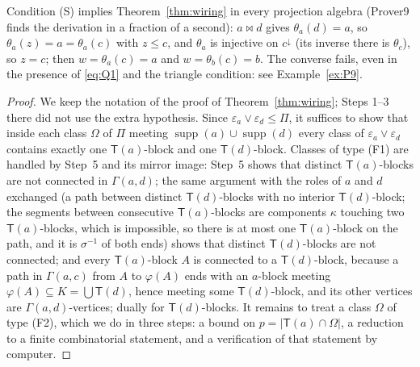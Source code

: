\documentclass[11pt]{amsart}
\theoremstyle{definition}
\newcommand{\supp}{\operatorname{supp}}
\newcommand{\T}{\mathsf{T}}
\begin{document}
Condition (S) implies Theorem~\ref{thm:wiring} in every projection algebra (Prover9 finds the derivation in a fraction of a second): $a\bowtie d$ gives $\theta_a(d)=a$, so $\theta_a(z)=a=\theta_a(c)$ with $z\le c$, and $\theta_a$ is injective on $c^{\downarrow}$ (its inverse there is $\theta_c$), so $z=c$; then $w=\theta_a(c)=a$ and $w=\theta_b(c)=b$. The converse fails, even in the presence of \eqref{eq:Q1} and the triangle condition: see Example~\ref{ex:P9}.

\begin{proof}
We keep the notation of the proof of Theorem~\ref{thm:wiring}; Steps 1--3 there did not use the extra hypothesis. Since $\varepsilon_a\vee\varepsilon_d\le\Pi$, it suffices to show that inside each class $\Omega$ of $\Pi$ meeting $\supp(a)\cup\supp(d)$ every class of $\varepsilon_a\vee\varepsilon_d$ contains exactly one $\T(a)$-block and one $\T(d)$-block. Classes of type (F1) are handled by Step~5 and its mirror image: Step~5 shows that distinct $\T(a)$-blocks are not connected in $\Gamma(a,d)$; the same argument with the roles of $a$ and $d$ exchanged (a path between distinct $\T(d)$-blocks with no interior $\T(d)$-block; the segments between consecutive $\T(a)$-blocks are components $\kappa$ touching two $\T(a)$-blocks, which is impossible, so there is at most one $\T(a)$-block on the path, and it is $\sigma^{-1}$ of both ends) shows that distinct $\T(d)$-blocks are not connected; and every $\T(a)$-block $A$ is connected to a $\T(d)$-block, because a path in $\Gamma(a,c)$ from $A$ to $\varphi(A)$ ends with an $a$-block meeting $\varphi(A)\subseteq K=\bigcup\T(d)$, hence meeting some $\T(d)$-block, and its other vertices are $\Gamma(a,d)$-vertices; dually for $\T(d)$-blocks. It remains to treat a class $\Omega$ of type (F2), which we do in three steps: a bound on $p=|\T(a)\cap\Omega|$, a reduction to a finite combinatorial statement, and a verification of that statement by computer.


\end{proof}
\end{document}
